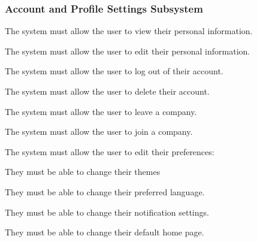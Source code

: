\documentclass{article}
\begin{document}
	\subsubsection*{Account and Profile Settings Subsystem}	
	\begin{list}{R.}{}
		\item The system must allow the user to view their personal information. 
		\item The system must allow the user to edit their personal information.
		\item The system must allow the user to log out of their account.
		\item The system must allow the user to delete their account.
		\item The system must allow the user to leave a company.
		\item The system must allow the user to join a company.
		\item The system must allow the user to edit their preferences: 
		\begin{list}{R.}{}
			\item They must be able to change their themes
			\item They must be able to change their preferred language.
			\item They must be able to change their notification settings.
			\item They must be able to change their default home page.
		\end{list}
	\end{list}
	
\end{document}
